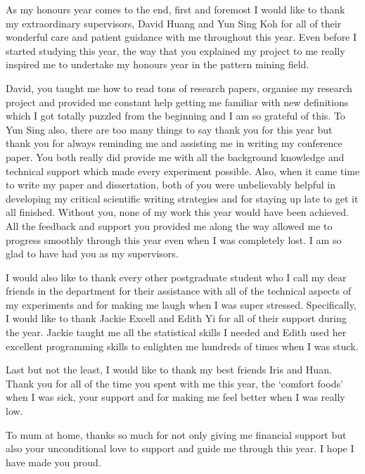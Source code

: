 \documentclass[12pt,examcopy]{uathesis}
\theoremstyle{definition}
\begin{document}
\begin{acknowledgements}
As my honours year comes to the end, first and foremost I would like to thank my extraordinary supervisors, David Huang and Yun Sing Koh for all of their wonderful care and patient guidance with me throughout this year. Even before I started studying this year, the way that you explained my project to me really inspired me to undertake my honours year in the pattern mining field. 

David, you taught me how to read tons of research papers, organise my research project and provided me constant help getting me familiar with new definitions which I got totally puzzled from the beginning and I am so grateful of this. To Yun Sing also, there are too many things to say thank you for this year but thank you for always reminding me and assisting me in writing my conference paper. You both really did provide me with all the background knowledge and technical support which made every experiment possible. Also, when it came time to write my paper and dissertation, both of you were unbelievably helpful in developing my critical scientific writing strategies and for staying up late to get it all finished. Without you, none of my work this year would have been achieved. All the feedback and support you provided me along the way allowed me to progress smoothly through this year even when I was completely lost. I am so glad to have had you as my supervisors.

I would also like to thank every other postgraduate student who I call my dear friends in the department for their assistance with all of the technical aspects of my experiments and for making me laugh when I was super stressed. Specifically, I would like to thank Jackie Excell and Edith Yi for all of their support during the year. Jackie taught me all the statistical skills I needed and Edith used her excellent programming skills to enlighten me hundreds of times when I was stuck.

Last but not the least, I would like to thank my best friends Iris and Huan. Thank you for all of the time you spent with me this year, the ‘comfort foods’ when I was sick, your support and for making me feel better when I was really low.

To mum at home, thanks so much for not only giving me financial support but also your unconditional love to support and guide me through this year. I hope I have made you proud.

\end{acknowledgements}
\end{document}
